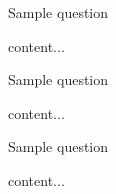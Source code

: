 \documentclass[11pt]{article} %
\begin{document}
	\begin{qstn}[\theQnum][][10]
		Sample question
	\begin{soln}
		content...
	\end{soln}
	\end{qstn}
	
	\begin{qstn}[\theQnum][][10]
		Sample question
	\begin{soln}
		content...
	\end{soln}
	\end{qstn}
	
	\begin{qstn}[\theQnum][][10]
		Sample question
	\begin{soln}
		content...
	\end{soln}
	\end{qstn}
\end{document}
